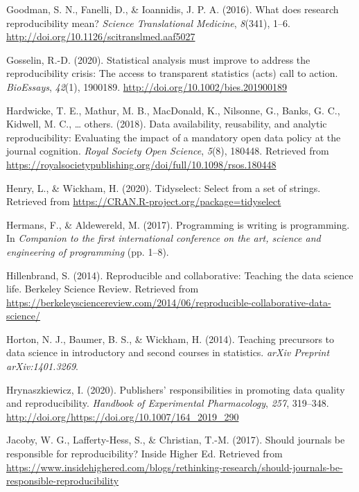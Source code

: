\documentclass[12pt,twoside]{reedthesis}
\begin{document}
\hypertarget{ref-Goodman341ps12}{}
Goodman, S. N., Fanelli, D., \& Ioannidis, J. P. A. (2016). What does
research reproducibility mean? \emph{Science Translational Medicine},
\emph{8}(341), 1--6. \url{http://doi.org/10.1126/scitranslmed.aaf5027}

\hypertarget{ref-bioessays-gosselin}{}
Gosselin, R.-D. (2020). Statistical analysis must improve to address the
reproducibility crisis: The access to transparent statistics (acts) call
to action. \emph{BioEssays}, \emph{42}(1), 1900189.
\url{http://doi.org/10.1002/bies.201900189}

\hypertarget{ref-hardwicke2018data}{}
Hardwicke, T. E., Mathur, M. B., MacDonald, K., Nilsonne, G., Banks, G.
C., Kidwell, M. C., \ldots{} others. (2018). Data availability,
reusability, and analytic reproducibility: Evaluating the impact of a
mandatory open data policy at the journal cognition. \emph{Royal Society
Open Science}, \emph{5}(8), 180448. Retrieved from
\url{https://royalsocietypublishing.org/doi/full/10.1098/rsos.180448}

\hypertarget{ref-R-tidyselect}{}
Henry, L., \& Wickham, H. (2020). Tidyselect: Select from a set of
strings. Retrieved from
\url{https://CRAN.R-project.org/package=tidyselect}

\hypertarget{ref-hermans2017programming}{}
Hermans, F., \& Aldewereld, M. (2017). Programming is writing is
programming. In \emph{Companion to the first international conference on
the art, science and engineering of programming} (pp. 1--8).

\hypertarget{ref-berkeley_teaching}{}
Hillenbrand, S. (2014). Reproducible and collaborative: Teaching the
data science life. Berkeley Science Review. Retrieved from
\url{https://berkeleysciencereview.com/2014/06/reproducible-collaborative-data-science/}

\hypertarget{ref-horton2014teaching}{}
Horton, N. J., Baumer, B. S., \& Wickham, H. (2014). Teaching precursors
to data science in introductory and second courses in statistics.
\emph{arXiv Preprint arXiv:1401.3269}.

\hypertarget{ref-hrynaszkiewicz2020publishers}{}
Hrynaszkiewicz, I. (2020). Publishers' responsibilities in promoting
data quality and reproducibility. \emph{Handbook of Experimental
Pharmacology}, \emph{257}, 319--348.
\url{http://doi.org/https://doi.org/10.1007/164_2019_290}

\hypertarget{ref-higher-ed}{}
Jacoby, W. G., Lafferty-Hess, S., \& Christian, T.-M. (2017). Should
journals be responsible for reproducibility? Inside Higher Ed. Retrieved
from
\url{https://www.insidehighered.com/blogs/rethinking-research/should-journals-be-responsible-reproducibility}
\end{document}
